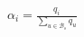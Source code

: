 \documentclass[border=1pt]{standalone}
\begin{document}
\color{navy}
\(\displaystyle
  \alpha_i=\frac{q_i}{\sum_{u\in\mathcal{B}_s}q_u}
\)
\end{document}
